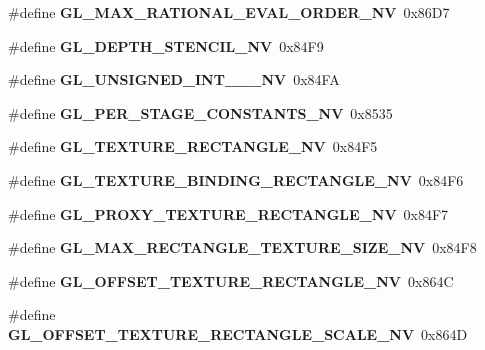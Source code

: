 \begin{DoxyCompactItemize}
\item 
\#define {\bfseries G\+L\+\_\+\+M\+A\+X\+\_\+\+R\+A\+T\+I\+O\+N\+A\+L\+\_\+\+E\+V\+A\+L\+\_\+\+O\+R\+D\+E\+R\+\_\+\+N\+V}~0x86\+D7\label{_s_d_l__opengl_8h_a3a970e07aeee1e9d1a56b095bab846a3}

\item 
\#define {\bfseries G\+L\+\_\+\+D\+E\+P\+T\+H\+\_\+\+S\+T\+E\+N\+C\+I\+L\+\_\+\+N\+V}~0x84\+F9\label{_s_d_l__opengl_8h_a912fde950690b8b00a08200da4bf59af}

\item 
\#define {\bfseries G\+L\+\_\+\+U\+N\+S\+I\+G\+N\+E\+D\+\_\+\+I\+N\+T\+\_\+\_\+\_\+\+N\+V}~0x84\+F\+A\label{_s_d_l__opengl_8h_aa242ed308ce41965314124f219df24b2}

\item 
\#define {\bfseries G\+L\+\_\+\+P\+E\+R\+\_\+\+S\+T\+A\+G\+E\+\_\+\+C\+O\+N\+S\+T\+A\+N\+T\+S\+\_\+\+N\+V}~0x8535\label{_s_d_l__opengl_8h_ae684ba3b435939f9a3ff0ebc565ed183}

\item 
\#define {\bfseries G\+L\+\_\+\+T\+E\+X\+T\+U\+R\+E\+\_\+\+R\+E\+C\+T\+A\+N\+G\+L\+E\+\_\+\+N\+V}~0x84\+F5\label{_s_d_l__opengl_8h_a8086185ae815ff734e7c294bf1c8c2a6}

\item 
\#define {\bfseries G\+L\+\_\+\+T\+E\+X\+T\+U\+R\+E\+\_\+\+B\+I\+N\+D\+I\+N\+G\+\_\+\+R\+E\+C\+T\+A\+N\+G\+L\+E\+\_\+\+N\+V}~0x84\+F6\label{_s_d_l__opengl_8h_aa201327aeca8a456ba4ad2200acd7160}

\item 
\#define {\bfseries G\+L\+\_\+\+P\+R\+O\+X\+Y\+\_\+\+T\+E\+X\+T\+U\+R\+E\+\_\+\+R\+E\+C\+T\+A\+N\+G\+L\+E\+\_\+\+N\+V}~0x84\+F7\label{_s_d_l__opengl_8h_a993441ff2787763694ca20b49df93fc2}

\item 
\#define {\bfseries G\+L\+\_\+\+M\+A\+X\+\_\+\+R\+E\+C\+T\+A\+N\+G\+L\+E\+\_\+\+T\+E\+X\+T\+U\+R\+E\+\_\+\+S\+I\+Z\+E\+\_\+\+N\+V}~0x84\+F8\label{_s_d_l__opengl_8h_a0957ed0aa08ed37189007bbf85efd492}

\item 
\#define {\bfseries G\+L\+\_\+\+O\+F\+F\+S\+E\+T\+\_\+\+T\+E\+X\+T\+U\+R\+E\+\_\+\+R\+E\+C\+T\+A\+N\+G\+L\+E\+\_\+\+N\+V}~0x864\+C\label{_s_d_l__opengl_8h_a0bbbe612cd4e7b2141514717203f09ff}

\item 
\#define {\bfseries G\+L\+\_\+\+O\+F\+F\+S\+E\+T\+\_\+\+T\+E\+X\+T\+U\+R\+E\+\_\+\+R\+E\+C\+T\+A\+N\+G\+L\+E\+\_\+\+S\+C\+A\+L\+E\+\_\+\+N\+V}~0x864\+D\label{_s_d_l__opengl_8h_ac24a9856b5b454a680e73b8fbb659695}


\end{DoxyCompactItemize}
